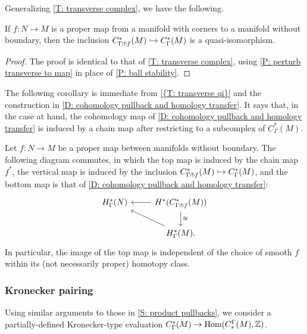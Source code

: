 Generalizing \cref{T: transverse complex}, we have the following.

\begin{theorem}\label{T: transverse qi}
	If $f \colon N \to M$ is a proper map from a manifold with corners to a manifold without boundary, then the inclusion $C^*_{\Gamma \pitchfork f}(M) \hookrightarrow C^*_\Gamma(M)$ is a quasi-isomorphism.
\end{theorem}
\begin{proof}
	The proof is identical to that of \cref{T: transverse complex}, using \cref{P: perturb transverse to map} in place of \cref{P: ball stability}.
\end{proof}

The following corollary is immediate from \cref{{T: transverse qi}} and the construction in \cref{D: cohomology pullback and homology transfer}.
It says that, in the case at hand, the cohomology map of \cref{D: cohomology pullback and homology transfer} is induced by a chain map after restricting to a subcomplex of $C^*_\Gamma(M)$.

\begin{corollary}\label{C: transverse cohomology pullback}
	Let $f \colon N \to M$ be a proper map between manifolds without boundary.
	The following diagram commutes, in which the top map is induced by the chain map $f^*$, the vertical map is induced by the inclusion $C^*_{\Gamma \pitchfork f}(M) \hookrightarrow C^*_\Gamma(M)$, and the bottom map is that of \cref{D: cohomology pullback and homology transfer}:
	\begin{equation*}
	\begin{tikzcd}
		H^*_\Gamma(N) & H^*(C^*_{\Gamma \pf f}(M)) \arrow[l]  \arrow[d,"\cong"]\\
		& H^*_\Gamma(M). \arrow[lu]
	\end{tikzcd}
	\end{equation*}
	In particular, the image of the top map is independent of the choice of smooth $f$ within its (not necessarily proper) homotopy class.
\end{corollary}

\subsubsection{Kronecker pairing}\label{S: Kronecker}
Using similar arguments to those in \cref{S: product pullbacks}, we consider a partially-defined Kronecker-type evaluation $C^*_\Gamma(M) \to \textup{Hom}(C_*^\Gamma(M),\mathbb{Z})$.

